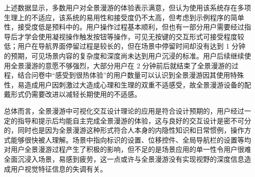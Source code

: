 上述数据显示，多数用户对全景漫游的体验表示满意，但认为使用该系统存在多项生理上的不适应，该系统的易用性和接受度仍不太高，但考虑到示例程序的简单性，接受度低是预料中的。用户操作过程基本顺利，但也有一部分用户需要经过指导后才学会使用凝视操作触发按钮等操作，可见无按键的交互形式可接受程度较低；用户在导航界面停留过程是较长的，但在场景中停留时间却没有达到 1 分钟的预期，可见场景内容的复杂度和深度尚未达到用户沉浸的标准。用户后续继续使用全景漫游的意愿不够强烈，大部分用户在 2 分钟前后就结束了全景漫游的过程，结合问卷中“感受到很热体验”的用户数量可以认识到全景漫游因其使用特殊性，易造成用户因刺激过大造成心理和生理的双重不适感受，故全景漫游设备的配戴形式仍需要改进以减轻长期使用的不适感。

总体而言，全景漫游中可视化交互设计理论的应用是符合设计预期的，用户经过一定的指导和提示后均能自主完成全景漫游的体验，这与良好的交互设计是密不可分的，同时也是因为全景漫游这种形式符合人本身的内隐性知识和日常惯例，操作方式能够很快被人理解。场景中指向标识的设置、位移控件、全局导航栏的设置等均对用户全景漫游过程产生了积极的影响，但不足的是场景应用的单一性令用户很难全面沉浸入场景，易感到疲劳，这一点或许与全景漫游没有实现视野的深度信息造成用户视觉特征信息的失调有关。